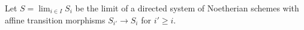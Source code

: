 \begin{situation}
\label{situation-limit-noetherian}
Let $S = \lim_{i \in I} S_i$ be the limit of a directed system of
Noetherian schemes with affine transition morphisms $S_{i'} \to S_i$
for $i' \geq i$.
\end{situation}